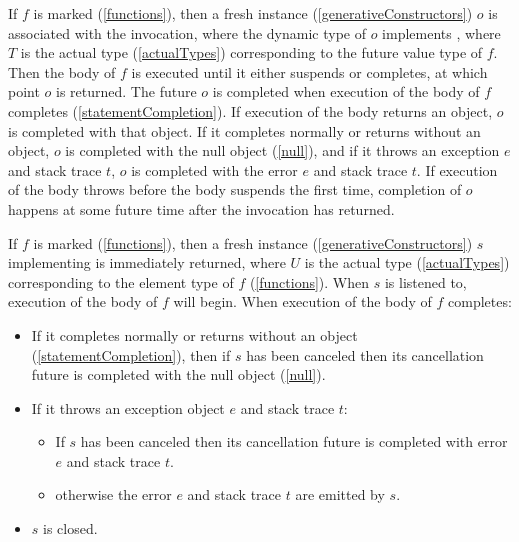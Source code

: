 \documentclass[makeidx]{article}
\begin{document}
{\LMHash{}%
If $f$ is marked \ASYNC{} (\ref{functions}),
then a fresh instance (\ref{generativeConstructors}) $o$
is associated with the invocation,
where the dynamic type of $o$ implements ,
where $T$ is the actual type
(\ref{actualTypes})
corresponding to the future value type of $f$.
Then the body of $f$ is executed until it either suspends or completes,
at which point $o$ is returned.
The future $o$ is completed when execution of the body of $f$ completes
(\ref{statementCompletion}).
If execution of the body returns an object, $o$ is completed with that object.
If it completes normally or returns without an object,
$o$ is completed with the null object (\ref{null}),
and if it throws an exception $e$ and stack trace $t$,
$o$ is completed with the error $e$ and stack trace $t$.
If execution of the body throws before the body suspends the first time,
completion of $o$ happens at some future time after the invocation has returned.

\LMHash{}%
If $f$ is marked \code{\ASYNC*} (\ref{functions}),
then a fresh instance (\ref{generativeConstructors}) $s$
implementing  is immediately returned,
where $U$ is the actual type
(\ref{actualTypes})
corresponding to the element type of $f$
(\ref{functions}).
When $s$ is listened to, execution of the body of $f$ will begin.
When execution of the body of $f$ completes:

\begin{itemize}
\item If it completes normally or returns without an object
  (\ref{statementCompletion}),
  then if $s$ has been canceled
  then its cancellation future is completed with the null object (\ref{null}).
\item If it throws an exception object $e$ and stack trace $t$:

  \begin{itemize}
  \item If $s$ has been canceled then its cancellation future is completed
    with error $e$ and stack trace $t$.
  \item otherwise the error $e$ and stack trace $t$ are emitted by $s$.
  \end{itemize}
\item $s$ is closed.
\end{itemize}

}
\end{document}
